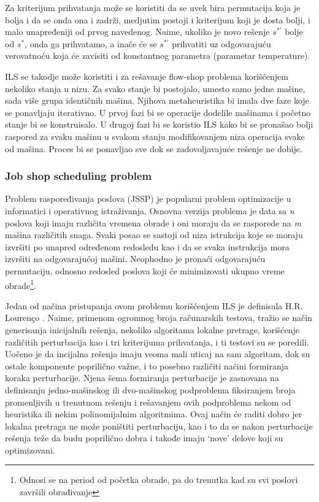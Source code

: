 \documentclass[a4paper]{article}
\newcommand{\sstar}[0]{$\textit{s}^*$}
\begin{document}
Za kriterijum prihvatanja može se koristiti da se uvek bira permutacija koja je bolja i da se onda ona i zadrži, medjutim postoji i kriterijum koji je dosta bolji, i malo unapređeniji od prvog navedenog. Naime, ukoliko je novo rešenje $\textit{s}^{*\prime}$ bolje od \sstar{}, onda ga prihvatamo, a inače će se $\textit{s}^{*\prime}$ prihvatiti uz odgovarajuću verovatnoću
koja će zavisiti od konstantnog parametra  (parametar temperature).

ILS se takodje može koristiti i za rešavanje flow-shop problema korišćenjem nekoliko stanja u nizu. Za svako stanje bi postojalo, umesto samo jedne mašine, sada više grupa identičnih mašina. Njihova metaheuristika bi imala dve faze koje se ponavljaju iterativno. U prvoj fazi bi se operacije dodelile mašinama i početno stanje bi se konstruisalo. U drugoj fazi bi se koristio ILS kako bi se pronašao bolji raspored za svaku mašinu u svakom stanju modifikovanjem niza operacija svake od mašina. Proces bi se ponavljao sve dok se zadovoljavajuće rešenje ne dobije. \cite{applyingIteratedLocalSearchtothePermutation,handbookOfMetaheuristics} 

\subsubsection{Job shop scheduling problem}
Problem raspoređivanja poslova (JSSP) je popularni problem optimizacije u informatici i operativnog istraživanja. 
Osnovna verzija problema je data sa \textit{n} poslova koji imaju različita vremena obrade i oni moraju da se rasporede na \textit{m} mašina različitih snaga. Svaki posao se sastoji od niza istrukcija koje se moraju izvršiti po unapred određenom redosledu kao i da se svaka instrukcija mora izvršiti na odgovarajućoj mašini. Neophodno je pronaći odgovarajuću permutaciju, odnosno redosled poslova koji će minimizovati ukupno vreme obrade\footnote{Odnosi se na period od početka obrade, pa do trenutka kad su svi poslovi završili obrađivanje}.

Jedan od načina pristupanja ovom problemu korišćenjem ILS je definisala H.R. Lourenço \cite{jobShopScheduling}. Naime, primenom ogromnog broja računarskih testova, tražio se način generisanja inicijalnih rešenja, nekoliko algoritama lokalne pretrage, korišćenje različitih perturbacija kao i tri kriterijuma prihvatanja, i ti testovi su se poredili. Uočeno je da incijalna rešenja imaju veoma mali uticaj na sam algoritam, dok su ostale komponente poprilično važne, i to posebno različiti načini formiranja koraka perturbacije. Njena šema formiranja perturbacije je zasnovana na definisanju jedno-mašinskog ili dvo-mašinskog podproblema fiksiranjem broja promenljivih u trenutnom rešenju i rešavanjem ovih podproblema nekom od heuristika ili nekim polinomijalnim algoritmima. Ovaj način će raditi dobro jer lokalna pretraga ne može poništiti perturbaciju, kao i to da se nakon perturbacije rešenja teže da budu poprilično dobra i takođe imaju \enquote*{nove} delove koji su optimizovani.
\end{document}
